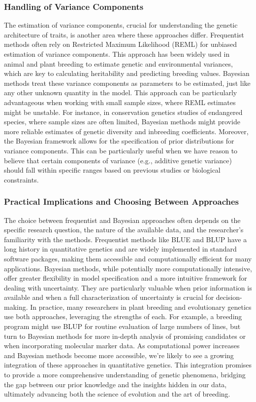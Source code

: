 \documentclass[12pt,a4paper]{article}
\begin{document}
\subsubsection{Handling of Variance Components}

The estimation of variance components, crucial for understanding the genetic architecture of traits, is another area where these approaches differ. Frequentist methods often rely on Restricted Maximum Likelihood (REML) for unbiased estimation of variance components. This approach has been widely used in animal and plant breeding to estimate genetic and environmental variances, which are key to calculating heritability and predicting breeding values. Bayesian methods treat these variance components as parameters to be estimated, just like any other unknown quantity in the model. This approach can be particularly advantageous when working with small sample sizes, where REML estimates might be unstable. For instance, in conservation genetics studies of endangered species, where sample sizes are often limited, Bayesian methods might provide more reliable estimates of genetic diversity and inbreeding coefficients. Moreover, the Bayesian framework allows for the specification of prior distributions for variance components. This can be particularly useful when we have reason to believe that certain components of variance (e.g., additive genetic variance) should fall within specific ranges based on previous studies or biological constraints.

\subsubsection{Practical Implications and Choosing Between Approaches}

The choice between frequentist and Bayesian approaches often depends on the specific research question, the nature of the available data, and the researcher's familiarity with the methods. Frequentist methods like BLUE and BLUP have a long history in quantitative genetics and are widely implemented in standard software packages, making them accessible and computationally efficient for many applications. Bayesian methods, while potentially more computationally intensive, offer greater flexibility in model specification and a more intuitive framework for dealing with uncertainty. They are particularly valuable when prior information is available and when a full characterization of uncertainty is crucial for decision-making. In practice, many researchers in plant breeding and evolutionary genetics use both approaches, leveraging the strengths of each. For example, a breeding program might use BLUP for routine evaluation of large numbers of lines, but turn to Bayesian methods for more in-depth analysis of promising candidates or when incorporating molecular marker data. As computational power increases and Bayesian methods become more accessible, we're likely to see a growing integration of these approaches in quantitative genetics. This integration promises to provide a more comprehensive understanding of genetic phenomena, bridging the gap between our prior knowledge and the insights hidden in our data, ultimately advancing both the science of evolution and the art of breeding.
\end{document}
